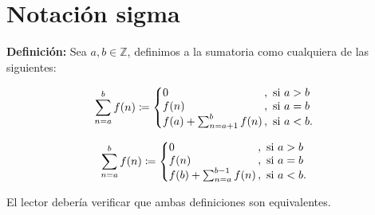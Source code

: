 \documentclass[11pt]{article}
\newcommand{\Z}{\mathbb{Z}}
\newcommand{\defined}{\coloneqq}
\begin{document}
 \pagebreak

 \section*{Notación sigma}

 \textbf{Definición:} Sea $a,b\in \Z$, definimos a la sumatoria como cualquiera de las siguientes:

 \begin{center}
  \begin{minipage}[c]{.5\linewidth}
    \[
    \sum_{n=a}^{b} f(n) \defined \left\{
   \begin{array}{@{}l@{\thinspace}l}
    0 &,  \ \text{si}  \ a>b\\
    f(n) &,  \ \text{si}  \ a=b\\
    f(a) + \sum_{n=a+1}^{b} f(n) &,  \ \text{si}  \ a<b.
   \end{array} \right. \]
   \end{minipage}%
  \begin{minipage}[c]{.5\linewidth}
   \[\sum_{n=a}^{b} f(n) \defined \left\{
    \begin{array}{@{}l@{\thinspace}l}
     0 &,  \ \text{si}  \ a>b\\
     f(n) &,  \ \text{si}  \ a=b\\
     f(b) + \sum_{n=a}^{b-1} f(n) &,  \ \text{si}  \ a<b.
    \end{array} \right. \]
  \end{minipage}
  \end{center}

El lector debería verificar que ambas definiciones son equivalentes.

\end{document}
